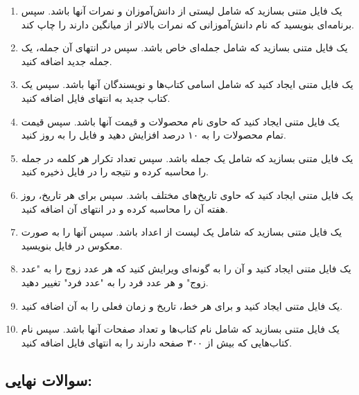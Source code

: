 \documentclass[b5paper,12pt]{article}
\begin{document}
	\begin{enumerate}
		\item یک فایل متنی بسازید که شامل لیستی از دانش‌آموزان و نمرات آنها باشد. سپس برنامه‌ای بنویسید که نام دانش‌آموزانی که نمرات بالاتر از میانگین دارند را چاپ کند.
		\item یک فایل متنی بسازید که شامل جمله‌ای خاص باشد. سپس در انتهای آن جمله، یک جمله جدید اضافه کنید.
		\item یک فایل متنی ایجاد کنید که شامل اسامی کتاب‌ها و نویسندگان آنها باشد. سپس یک کتاب جدید به انتهای فایل اضافه کنید.
		\item یک فایل متنی ایجاد کنید که حاوی نام محصولات و قیمت آنها باشد. سپس قیمت تمام محصولات را به ۱۰ درصد افزایش دهید و فایل را به روز کنید.
		\item یک فایل متنی بسازید که شامل یک جمله باشد. سپس تعداد تکرار هر کلمه در جمله را محاسبه کرده و نتیجه را در فایل ذخیره کنید.
		\item یک فایل متنی ایجاد کنید که حاوی تاریخ‌های مختلف باشد. سپس برای هر تاریخ، روز هفته آن را محاسبه کرده و در انتهای آن اضافه کنید.
		\item یک فایل متنی بسازید که شامل یک لیست از اعداد باشد. سپس آنها را به صورت معکوس در فایل بنویسید.
		\item یک فایل متنی ایجاد کنید و آن را به گونه‌ای ویرایش کنید که هر عدد زوج را به "عدد زوج" و هر عدد فرد را به "عدد فرد" تغییر دهید.
		\item یک فایل متنی ایجاد کنید و برای هر خط، تاریخ و زمان فعلی را به آن اضافه کنید.
		\item یک فایل متنی بسازید که شامل نام کتاب‌ها و تعداد صفحات آنها باشد. سپس نام کتاب‌هایی که بیش از ۳۰۰ صفحه دارند را به انتهای فایل اضافه کنید.
	\end{enumerate}
	
	\subsection*{سوالات نهایی:}
	
\end{document}
